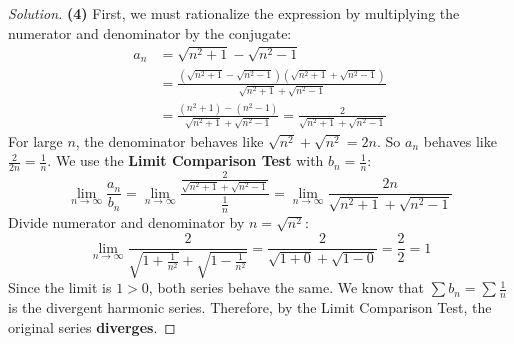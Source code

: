 \documentclass[11pt]{article}
\theoremstyle{definition}
\newenvironment{solution}{\begin{proof}[Solution]}{\end{proof}}
\begin{document}
\begin{solution}
\textbf{(4)} First, we must rationalize the expression by multiplying the numerator and denominator by the conjugate:
\begin{align*}
a_n &= \sqrt{n^2+1}-\sqrt{n^2-1} \\
&= \frac{(\sqrt{n^2+1}-\sqrt{n^2-1})(\sqrt{n^2+1}+\sqrt{n^2-1})}{\sqrt{n^2+1}+\sqrt{n^2-1}} \\
&= \frac{(n^2+1) - (n^2-1)}{\sqrt{n^2+1}+\sqrt{n^2-1}} = \frac{2}{\sqrt{n^2+1}+\sqrt{n^2-1}}
\end{align*}
For large $n$, the denominator behaves like $\sqrt{n^2} + \sqrt{n^2} = 2n$. So $a_n$ behaves like $\frac{2}{2n} = \frac{1}{n}$.
We use the \textbf{Limit Comparison Test} with $b_n = \frac{1}{n}$:
\[
\lim_{n \to \infty} \frac{a_n}{b_n} = \lim_{n \to \infty} \frac{\frac{2}{\sqrt{n^2+1}+\sqrt{n^2-1}}}{\frac{1}{n}} = \lim_{n \to \infty} \frac{2n}{\sqrt{n^2+1}+\sqrt{n^2-1}}
\]
Divide numerator and denominator by $n = \sqrt{n^2}$:
\[
\lim_{n \to \infty} \frac{2}{\sqrt{1+\frac{1}{n^2}} + \sqrt{1-\frac{1}{n^2}}} = \frac{2}{\sqrt{1+0} + \sqrt{1-0}} = \frac{2}{2} = 1
\]
Since the limit is $1 > 0$, both series behave the same.
We know that $\sum b_n = \sum \frac{1}{n}$ is the divergent harmonic series.
Therefore, by the Limit Comparison Test, the original series \textbf{diverges}.
\end{solution}
\end{document}
